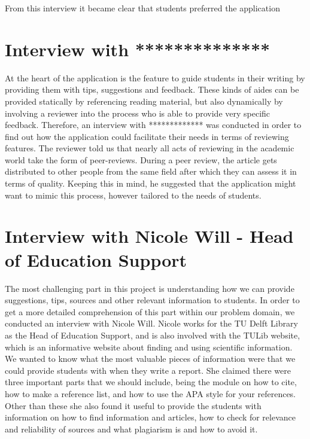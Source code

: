 From this interview it became clear that students preferred the application 

\section{Interview with **************}
At the heart of the application is the feature to guide students in their writing by providing them with tips, suggestions and feedback. These kinds of aides can be provided statically by referencing reading material, but also dynamically by involving a reviewer into the process who is able to provide very specific feedback. Therefore, an interview with ************* was conducted in order to find out how the application could facilitate their needs in terms of reviewing features. The reviewer told us that nearly all acts of reviewing in the academic world take the form of peer-reviews. During a peer review, the article gets distributed to other people from the same field after which they can assess it in terms of quality. Keeping this in mind, he suggested that the application might want to mimic this process, however tailored to the needs of students.


\section{Interview with Nicole Will - Head of Education Support}
 The most challenging part in this project is understanding how we can provide suggestions, tips, sources and other relevant information to students. In order to get a more detailed comprehension of this part within our problem domain, we conducted an interview with Nicole Will. Nicole works for the TU Delft Library as the Head of Education Support, and is also involved with the TULib website, which is an informative website about finding and using scientific information.
We wanted to know what the most valuable pieces of information were that we could provide students with when they write a report. She claimed there were three important parts that we should include, being the module on how to cite\cite{tulib:howtocite}, how to make a reference list, and how to use the APA\cite{tulib:apa} style for your references.
Other than these she also found it useful to provide the students with information on how to find information and articles, how to check for relevance and reliability of sources and what plagiarism is and how to avoid it.